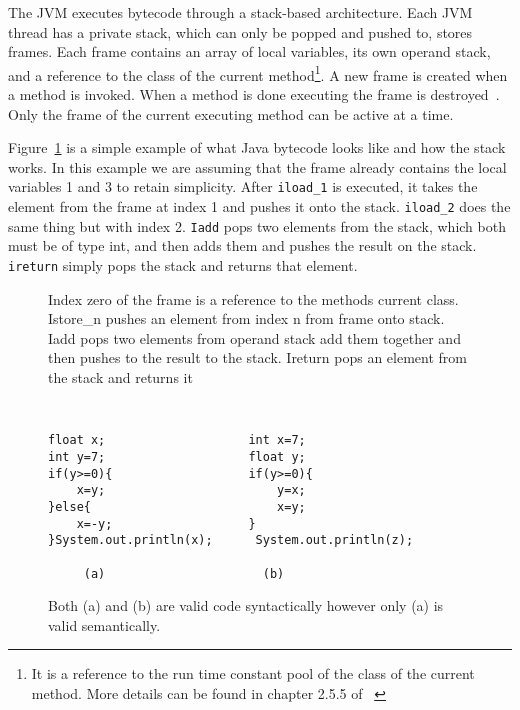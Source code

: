 \documentclass{sig-alternate}
\begin{document}
The JVM executes bytecode through a stack-based architecture. Each JVM thread has a private stack, which can only be popped and pushed to, stores frames. Each frame contains an array of local variables, its own operand stack, and a reference to the class of the current method\footnote{It is a reference to the run time constant pool of the class of the current method. More details can be found in chapter 2.5.5 of ~\cite{JVMspec:2013}}. A new frame is created when a method is invoked. When a method is done executing the frame is destroyed~\cite{Oracle:2013}. Only the frame of the current executing method can be active at a time.

Figure~\ref{stack} is a simple example of what Java bytecode looks like and how the stack works. In this example we are assuming that the frame already contains the local variables 1 and 3 to retain simplicity. After \texttt{iload\_1} is executed, it takes the element from the frame at index 1 and pushes it onto the stack. \texttt{iload\_2} does the same thing but with index 2. \texttt{Iadd} pops two elements from the stack, which both must be of type int, and then adds them and pushes the result on the stack. \texttt{ireturn} simply pops the stack and returns that element.


\begin{figure}
\centering
{}

\caption{Index zero of the frame is a reference to the methods current class. Istore\_n pushes an element from index n from frame onto stack. Iadd pops two elements from operand stack add them together and then pushes to the result to the stack. Ireturn pops an element from the stack and returns it}
\label{stack}
\end{figure}

\begin{figure}
\centering
{\tt
\begin{verbatim}
float x;                    int x=7;
int y=7;                    float y;
if(y>=0){                   if(y>=0){
    x=y;                        y=x;
}else{                          x=y;
    x=-y;                   }
}System.out.println(x);      System.out.println(z);	
     
     (a)                      (b)

\end{verbatim}
}
\caption{Both (a) and (b) are valid code syntactically however only (a) is valid semantically.}
\label{semantics}
\end{figure}
\end{document}

